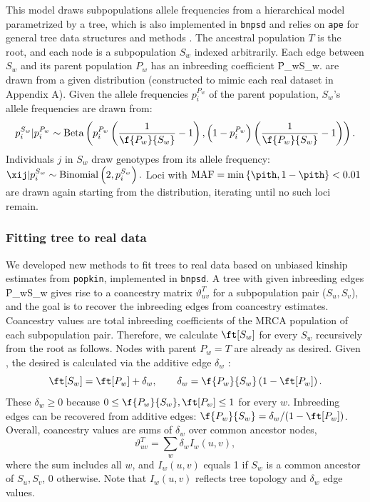 \documentclass[11pt]{article}
\begin{document}
This model draws subpopulations allele frequencies from a hierarchical model parametrized by a tree, which is also implemented in \texttt{bnpsd} and relies on \texttt{ape} for general tree data structures and methods \citep{paradis_ape_2019}.
The ancestral population $T$ is the root, and each node is a subpopulation $S_w$ indexed arbitrarily.
Each edge between $S_w$ and its parent population $P_w$ has an inbreeding coefficient \f{P_w}{S_w}.
\pit are drawn from a given distribution (constructed to mimic each real dataset in Appendix A).
Given the allele frequencies $p_i^{P_w}$ of the parent population, $S_w$'s allele frequencies are drawn from:
$$
p_i^{S_w} | p_i^{P_w}
\sim
\text{Beta} \left(
  p_i^{P_w} \left( \frac{1}{ \f{P_w}{S_w} } - 1 \right),
  \left( 1 - p_i^{P_w} \right) \left( \frac{1}{ \f{P_w}{S_w} } - 1 \right)
\right)
.
$$
Individuals $j$ in $S_w$ draw genotypes from its allele frequency:
$
\xij | p_i^{S_w}
\sim
\text{Binomial}\left( 2, p_i^{S_w} \right)
.
$
Loci with $\text{MAF} = \min \left\{ \pith, 1 - \pith \right\} < 0.01$ are drawn again starting from the \pit distribution, iterating until no such loci remain.

\subsubsection{Fitting tree to real data}

We developed new methods to fit trees to real data based on unbiased kinship estimates from \texttt{popkin}, implemented in \texttt{bnpsd}.
A tree with given inbreeding edges \f{P_w}{S_w} gives rise to a coancestry matrix $\vartheta_{uv}^T$ for a subpopulation pair ($S_u,S_v$), and the goal is to recover the inbreeding edges from coancestry estimates.
Coancestry values are total inbreeding coefficients of the MRCA population of each subpopulation pair.
Therefore, we calculate $\ft[S_w]$ for every $S_w$ recursively from the root as follows.
Nodes with parent $P_w = T$ are already as desired.
Given \ft[P_w], the desired \ft[S_w] is calculated via the additive edge $\delta_w$ \citep{ochoa_estimating_2021}:
\begin{equation}
  \label{eq:inbr_total_additive}
  \ft[S_w] = \ft[P_w] + \delta_w,
  \quad\quad
  \delta_w = \f{P_w}{S_w} \left( 1 - \ft[P_w] \right).
\end{equation}
These $\delta_w \ge 0$ because $0 \le \f{P_w}{S_w}, \ft[P_w] \le 1$ for every $w$.
Inbreeding edges can be recovered from additive edges:
$\f{P_w}{S_w} = \delta_w /( 1 - \ft[P_w] )$.
Overall, coancestry values are sums of $\delta_w$ over common ancestor nodes,
\begin{equation}
  \label{eq:coanc_tree_additive}
  \vartheta_{uv}^T
  =
  \sum_w \delta_w I_w(u,v)
  ,
\end{equation}
where the sum includes all $w$, and $I_w(u,v)$ equals 1 if $S_w$ is a common ancestor of $S_u,S_v$, 0 otherwise.
Note that $I_w(u,v)$ reflects tree topology and $\delta_w$ edge values.
\end{document}

